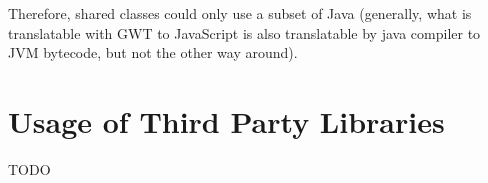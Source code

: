 Therefore, shared classes could only use a subset of Java (generally, what is translatable with GWT to JavaScript is also translatable by java compiler to JVM bytecode, but not the other way around).

\section{Usage of Third Party Libraries}

TODO 

%
%
%
%            
%
%
%                
%
%
%
%                        
%
%
%
%
%
%
